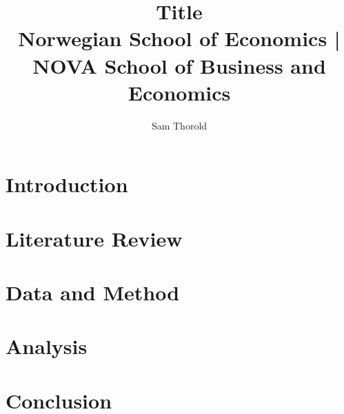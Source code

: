 \documentclass[12pt]{article}
\begin{document}
\title{Title \\
  \large Norwegian School of Economics |
  NOVA School of Business and Economics}
\author{Sam Thorold}
\maketitle
\pagebreak

\tableofcontents
\pagebreak

\section{Introduction}


\section{Literature Review}


\section{Data and Method}


\section{Analysis}


\section{Conclusion}

\end{document}
